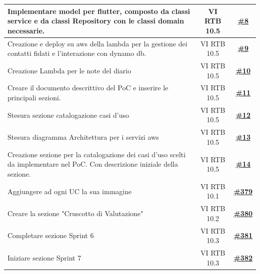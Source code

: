 \documentclass[a4paper,12pt]{article}
\newcommand{\ignoreglossary}{}
\begin{document}
\begin{longtable}{|>{\raggedright\arraybackslash}p{}|c|c|}
Implementare model per flutter, composto da classi service e da classi Repository con le classi domain necessarie. & VI \ignoreglossary{RTB} 10.5 & \href{https://github.com/SWE-BitByBit/project-PoC/issues/8}{\textbf{\#8}} \\
\hline
\rowcolor{white}
Creazione e deploy su aws della lambda per la gestione dei contatti fidati e l'interazione con dynamo db. & VI \ignoreglossary{RTB} 10.5 & \href{https://github.com/SWE-BitByBit/project-PoC/issues/9}{\textbf{\#9}} \\
\hline
\rowcolor{gray!20}
Creazione Lambda per le note del diario & VI \ignoreglossary{RTB} 10.5 & \href{https://github.com/SWE-BitByBit/project-PoC/issues/10}{\textbf{\#10}} \\
\hline
\rowcolor{white}
Creare il documento descrittivo del PoC e inserire le principali sezioni. & VI \ignoreglossary{RTB} 10.5 & \href{https://github.com/SWE-BitByBit/project-PoC/issues/11}{\textbf{\#11}} \\
\hline
\rowcolor{gray!20}
Stesura sezione catalogazione casi d'uso & VI \ignoreglossary{RTB} 10.5 & \href{https://github.com/SWE-BitByBit/project-PoC/issues/12}{\textbf{\#12}} \\
\hline
\rowcolor{white}
Stesura diagramma Architettura per i servizi aws & VI \ignoreglossary{RTB} 10.5 & \href{https://github.com/SWE-BitByBit/project-PoC/issues/13}{\textbf{\#13}} \\
\hline
\rowcolor{gray!20}
Creazione sezione per la catalogazione dei casi d'uso scelti da implementare nel PoC. Con descrizione iniziale della sezione. & VI \ignoreglossary{RTB} 10.5 & \href{https://github.com/SWE-BitByBit/project-PoC/issues/14}{\textbf{\#14}} \\
\hline
\rowcolor{white}
Aggiungere ad ogni UC la sua immagine & VI \ignoreglossary{RTB} 10.1 & \href{https://github.com/SWE-BitByBit/SWE-docs/issues/379}{\textbf{\#379}} \\
\hline
\rowcolor{gray!20}
Creare la sezione "Cruscotto di Valutazione" & VI \ignoreglossary{RTB} 10.2 & \href{https://github.com/SWE-BitByBit/SWE-docs/issues/380}{\textbf{\#380}} \\
\hline
\rowcolor{white}
Completare sezione Sprint 6 & VI \ignoreglossary{RTB} 10.3 & \href{https://github.com/SWE-BitByBit/SWE-docs/issues/381}{\textbf{\#381}} \\
\hline
\rowcolor{gray!20}
Iniziare sezione Sprint 7 & VI \ignoreglossary{RTB} 10.3 & \href{https://github.com/SWE-BitByBit/SWE-docs/issues/382}{\textbf{\#382}} \\

\end{longtable}
\end{document}
